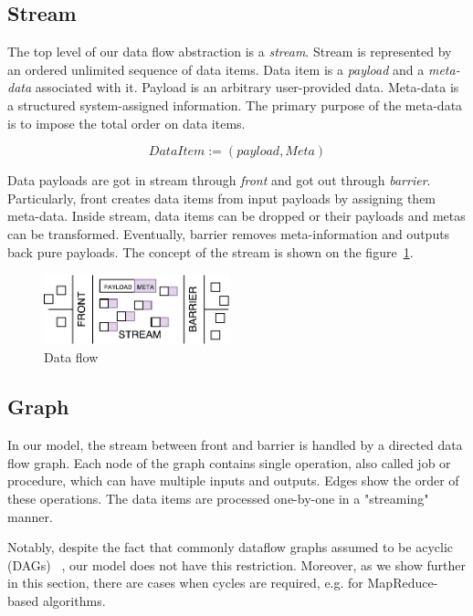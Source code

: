 
\label {fs-data-flow}

\subsection{Stream}

The top level of our data flow abstraction is a {\it stream}. Stream is represented by an ordered unlimited sequence of data items. Data item is a {\it payload} and a {\it meta-data} associated with it. Payload is an arbitrary user-provided data. Meta-data is a structured system-assigned information. The primary purpose of the meta-data is to impose the total order on data items. 

\[DataItem := (payload, Meta)\]

Data payloads are got in stream through {\it front} and got out through {\it barrier}. Particularly, front creates data items from input payloads by assigning them meta-data. Inside stream, data items can be dropped or their payloads and metas can be transformed. Eventually, barrier removes meta-information and outputs back pure payloads. The concept of the stream is shown on the figure~\ref{stream}.

\begin{figure}[htbp]
  \centering
  \includegraphics[width=0.48\textwidth]{pics/stream}
  \caption{Data flow}
  \label {stream}
\end{figure}

\subsection{Graph}

In our model, the stream between front and barrier is handled by a directed data flow graph. Each node of the graph contains single operation, also called job or procedure, which can have multiple inputs and outputs. Edges show the order of these operations. The data items are processed one-by-one in a "streaming" manner.

Notably, despite the fact that commonly dataflow graphs assumed to be acyclic (DAGs) 
~\cite{Zaharia:2016:ASU:3013530.2934664, Carbone:2017:SMA:3137765.3137777},
our model does not have this restriction. Moreover, as we show further in this section, there are cases when cycles are required, e.g. for MapReduce-based algorithms. 


